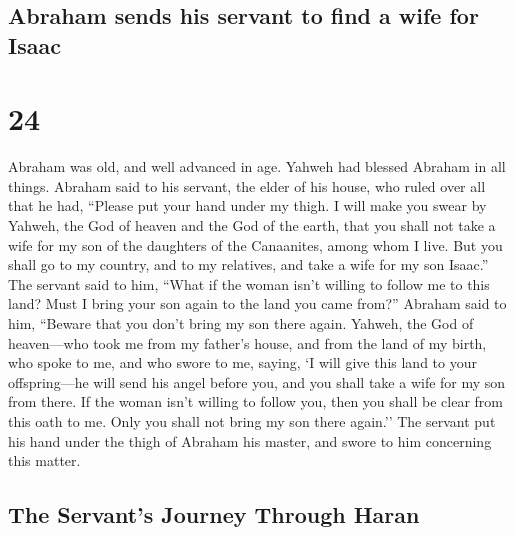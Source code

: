 \hypertarget{abraham-sends-his-servant-to-find-a-wife-for-isaac}{%
\subsection{Abraham sends his servant to find a wife for
Isaac}\label{abraham-sends-his-servant-to-find-a-wife-for-isaac}}

\hypertarget{section-23}{%
\section{24}\label{section-23}}

 Abraham was old, and well advanced in age. Yahweh had
blessed Abraham in all things.  Abraham said to his
servant, the elder of his house, who ruled over all that he had,
``Please put your hand under my thigh.  I will make you
swear by Yahweh, the God of heaven and the God of the earth, that you
shall not take a wife for my son of the daughters of the Canaanites,
among whom I live.  But you shall go to my country, and to
my relatives, and take a wife for my son Isaac.''  The
servant said to him, ``What if the woman isn't willing to follow me to
this land? Must I bring your son again to the land you came from?''
 Abraham said to him, ``Beware that you don't bring my son
there again.  Yahweh, the God of heaven---who took me from
my father's house, and from the land of my birth, who spoke to me, and
who swore to me, saying, `I will give this land to your offspring---he
will send his angel before you, and you shall take a wife for my son
from there.  If the woman isn't willing to follow you,
then you shall be clear from this oath to me. Only you shall not bring
my son there again.''  The servant put his hand under the
thigh of Abraham his master, and swore to him concerning this matter.

\hypertarget{the-servants-journey-through-haran}{%
\subsection{The Servant's Journey Through
Haran}\label{the-servants-journey-through-haran}}

